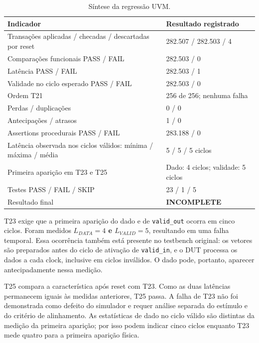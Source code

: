 \documentclass[12pt,a4paper]{article}
\begin{document}
\normalsize
\begin{table}[H]\centering
\begin{tabular}{p{12cm}p{8cm}}\toprule
\textbf{Indicador} & \textbf{Resultado registrado}\\\midrule
Transações aplicadas / checadas / descartadas por reset & 282.507 / 282.503 / 4\\
Comparações funcionais PASS / FAIL & 282.503 / 0\\
Latência PASS / FAIL & 282.503 / 1\\
Validade no ciclo esperado PASS / FAIL & 282.503 / 0\\
Ordem T21 & 256 de 256; nenhuma falha\\
Perdas / duplicações & 0 / 0\\
Antecipações / atrasos & 1 / 0\\
Assertions procedurais PASS / FAIL & 283.188 / 0\\
Latência observada nos ciclos válidos: mínima / máxima / média & 5 / 5 / 5 ciclos\\
Primeira aparição em T23 e T25 & Dado: 4 ciclos; validade: 5 ciclos\\
Testes PASS / FAIL / SKIP & 23 / 1 / 5\\
Resultado final & \textbf{INCOMPLETE}\\\bottomrule
\end{tabular}
\caption{Síntese da regressão UVM.}
\end{table}


T23 exige que a primeira aparição do dado e de \texttt{valid\_out} ocorra em cinco ciclos. Foram medidos \textbf{$L_{DATA}=4$ e $L_{VALID}=5$}, resultando em uma falha temporal. Essa ocorrência também está presente no testbench original: os vetores são preparados antes do ciclo de ativação de \texttt{valid\_in}, e o DUT processa os dados a cada clock, inclusive em ciclos inválidos. O dado pode, portanto, aparecer antecipadamente nessa medição.

T25 compara a característica após reset com T23. Como as duas latências permanecem iguais às medidas anteriores, T25 passa. A falha de T23 não foi demonstrada como defeito do simulador e requer análise separada do estímulo e do critério de alinhamento. As estatísticas de dado no ciclo válido são distintas da medição da primeira aparição; por isso podem indicar cinco ciclos enquanto T23 mede quatro para a primeira aparição física.
\end{document}
